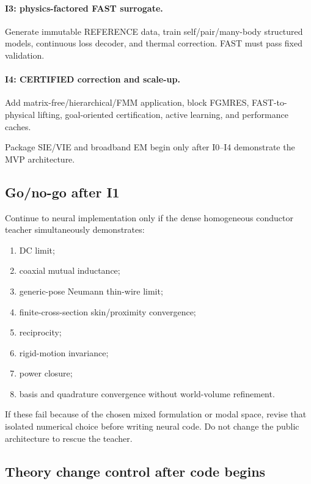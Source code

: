 \paragraph{I3: physics-factored FAST surrogate.}
Generate immutable REFERENCE data, train self/pair/many-body structured models,
continuous loss decoder, and thermal correction. FAST must pass fixed validation.

\paragraph{I4: CERTIFIED correction and scale-up.}
Add matrix-free/hierarchical/FMM application, block FGMRES, FAST-to-physical
lifting, goal-oriented certification, active learning, and performance caches.

Package SIE/VIE and broadband EM begin only after I0--I4 demonstrate the MVP
architecture.

\subsection{Go/no-go after I1}

Continue to neural implementation only if the dense homogeneous conductor
teacher simultaneously demonstrates:
\begin{enumerate}
\item DC limit;
\item coaxial mutual inductance;
\item generic-pose Neumann thin-wire limit;
\item finite-cross-section skin/proximity convergence;
\item reciprocity;
\item rigid-motion invariance;
\item power closure;
\item basis and quadrature convergence without world-volume refinement.
\end{enumerate}

If these fail because of the chosen mixed formulation or modal space, revise
that isolated numerical choice before writing neural code. Do not change the
public architecture to rescue the teacher.

\subsection{Theory change control after code begins}

